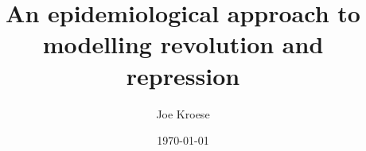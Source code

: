 \documentclass[a4paper,11pt]{report}
\begin{document}
\author{Joe Kroese}
\title{An epidemiological approach to modelling revolution and repression}
\date{\today}


\tableofcontents













{}

\end{document}
